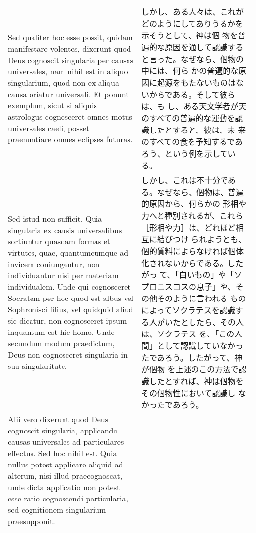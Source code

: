 \documentclass[10pt]{jsarticle} %
\begin{document}
\begin{longtable}{p{21em}p{21em}}
\\



Sed qualiter hoc
esse possit, quidam manifestare volentes, dixerunt quod Deus cognoscit
singularia per causas universales, nam nihil est in aliquo singularium,
quod non ex aliqua causa oriatur universali. Et ponunt exemplum, sicut
si aliquis astrologus cognosceret omnes motus universales caeli, posset
praenuntiare omnes eclipses futuras. 

&

しかし、ある人々は、これがどのようにしてありうるかを示そうとして、神は個
 物を普遍的な原因を通して認識すると言った。なぜなら、個物の中には、何ら
 かの普遍的な原因に起源をもたないものはないからである。そして彼らは、も
 し、ある天文学者が天のすべての普遍的な運動を認識したとすると、彼は、未
 来のすべての食を予知するであろう、という例を示している。

\\

Sed istud non sufficit. Quia
singularia ex causis universalibus sortiuntur quasdam formas et
virtutes, quae, quantumcumque ad invicem coniungantur, non individuantur
nisi per materiam individualem. Unde qui cognosceret Socratem per hoc
quod est albus vel Sophronisci filius, vel quidquid aliud sic dicatur,
non cognosceret ipsum inquantum est hic homo. Unde secundum modum
praedictum, Deus non cognosceret singularia in sua singularitate. 

&

しかし、これは不十分である。なぜなら、個物は、普遍的原因から、何らかの
形相や力へと種別されるが、これら［形相や力］は、どれほど相互に結びつけ
られようとも、個的質料によらなければ個体化されないからである。したがっ
て、「白いもの」や「ソプロニスコスの息子」や、その他そのように言われる
ものによってソクラテスを認識する人がいたとしたら、その人は、ソクラテス
を、「この人間」として認識していなかったであろう。したがって、神が個物
を上述のこの方法で認識したとすれば、神は個物をその個物性において認識し
なかったであろう。

\\



Alii vero dixerunt quod Deus cognoscit singularia, applicando causas
universales ad particulares effectus. Sed hoc nihil est. Quia nullus
potest applicare aliquid ad alterum, nisi illud praecognoscat, unde
dicta applicatio non potest esse ratio cognoscendi particularia, sed
cognitionem singularium praesupponit.


&


\end{longtable}
\end{document}
